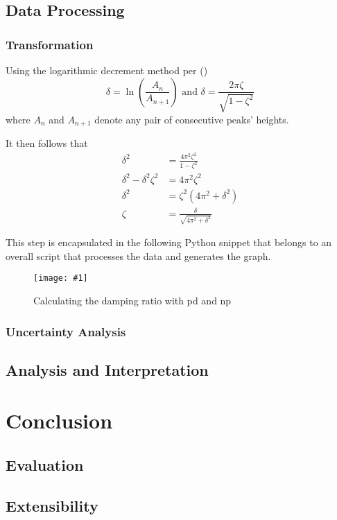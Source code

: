 \documentclass[a4paper,12pt]{article}
\newcommand{\img}[4]{\begin{center}
  \begin{figure}[H]
    \centering
    \texttt{[image: \#1]}
    \caption{#3}
    \label{fig:#4}
  \end{figure}
\end{center}}
\newcommand{\paren}[1]{\left(#1\right)}
\begin{document}
\subsection{Data Processing}

\subsubsection{Transformation}

Using the logarithmic decrement method per  (\citeyear{inman_2008_engineering})
$$\delta = \ln\paren{\frac{A_n}{A_{n+1}}} \text{ and } \delta = \frac{2\pi \zeta}{\sqrt{1 - \zeta^2}}$$ where $A_n$ and $A_{n + 1}$ denote any pair of consecutive peaks' heights.

\noindent It then follows that
\begin{align*}
  \delta^2                   & = \frac{4\pi^2 \zeta^2}{1 - \zeta^2}      \\
  \delta^2 - \delta^2\zeta^2 & = 4\pi^2\zeta^2                           \\
  \delta^2                   & = \zeta^2\paren{4\pi^2 + \delta^2}        \\
  \zeta                      & = \frac{\delta}{\sqrt{4\pi^2 + \delta^2}}
\end{align*}

This step is encapsulated in the following Python snippet that belongs to an overall script that processes the data and generates the graph.

\img{figs/code/damping.png}{0.95}{Calculating the damping ratio with pd and np}{damping_code}

\subsubsection{Uncertainty Analysis}

\subsection{Analysis and Interpretation}

\section{Conclusion}

\subsection{Evaluation}

\subsection{Extensibility}

\pagebreak

\printbibliography
\end{document}
